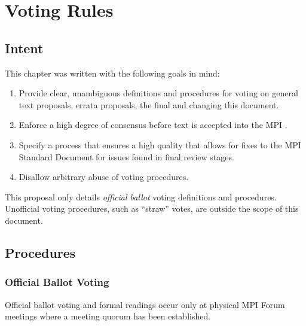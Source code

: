 \chapter{Voting Rules}


\section{Intent}

This chapter was written with the following goals in mind:

\begin{enumerate}
\item Provide clear, unambiguous definitions and procedures for voting
  on general text proposals, errata proposals, the final
  {\color{red}{MPI Standard Document}} and changing this document.
\item Enforce a high degree of consensus before text is accepted into
  the MPI {\color{red}{Standard Document}}.
\item {\color{red} Specify} a process that ensures a high quality
  {\color{red}{MPI Standard Document}} that allows for fixes to the
  MPI Standard Document for issues found in final review stages.
\item Disallow arbitrary abuse of voting procedures.
\end{enumerate}

This proposal only details {\em official ballot} voting definitions
and procedures.  Unofficial voting procedures, such as ``straw''
votes, are outside the scope of this document.


\section{Procedures}


\subsection{Official Ballot Voting}
\label{subsec:official-ballot-voting}

Official ballot voting and formal readings occur only at physical MPI
Forum meetings where a meeting quorum has been established.

